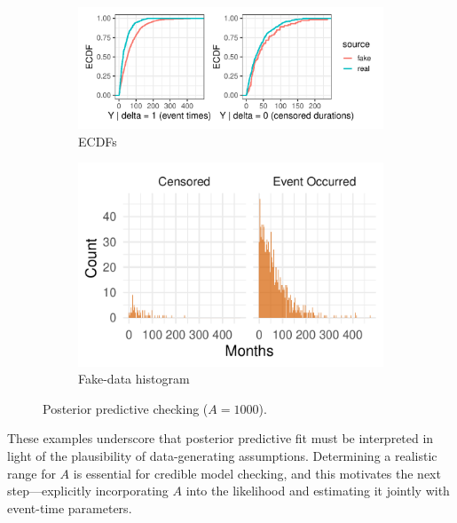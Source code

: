 \begin{figure}[H]
\centering
\begin{subfigure}[t]{0.64\textwidth}
  \centering
  \includegraphics[width=\textwidth]{images/ppc_two_a1000.pdf}  %
  \caption{{\small ECDFs}}
  \label{fig:ecdf-event_a1000}
\end{subfigure}
\begin{subfigure}[t]{0.35\textwidth}
  \centering
  \includegraphics[width=\linewidth]{images/fake_duration_hist_a1000.pdf}   %
  \caption{{\small Fake-data histogram}}
  \label{fig:fake-hist_a1000}
\end{subfigure}
\caption{{\small Posterior predictive checking ($A=1000$).}}
\label{fig:ppc-A1000}
\end{figure}
These examples underscore that posterior predictive fit must be interpreted in light of the plausibility of data-generating assumptions. Determining a realistic range for $A$ is essential for credible model checking, and this motivates the next step—explicitly incorporating $A$ into the likelihood and estimating it jointly with event-time parameters.